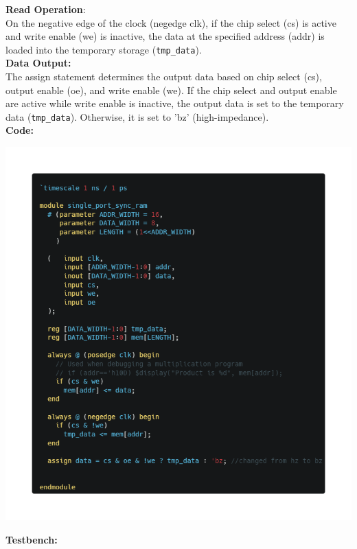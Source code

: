 \documentclass[12pt]{article}
\begin{document}
\textbf{Read Operation}:\\
On the negative edge of the clock (negedge clk), if the chip select (cs) is active and write enable (we) is inactive, the data at the specified address (addr) is loaded into the temporary storage (\verb|tmp_data|).\\
\textbf{Data Output:}\\
The assign statement determines the output data based on chip select (cs), output enable (oe), and write enable (we). If the chip select and output enable are active while write enable is inactive, the output data is set to the temporary data (\verb|tmp_data|). Otherwise, it is set to 'bz' (high-impedance).\\
\textbf{Code:}
\begin{center}
    \includegraphics[scale=0.5]{images/ram.png}
\end{center}
\pagebreak
\textbf{Testbench:}
\end{document}
